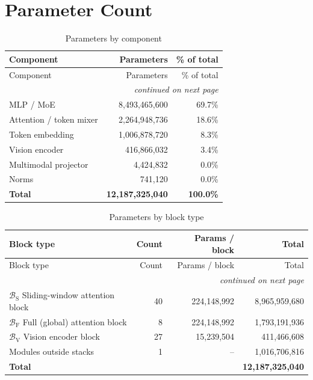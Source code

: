 \documentclass[10pt,a4paper]{article}
\theoremstyle{definition}
\begin{document}
\section{Parameter Count}
\begin{longtable}{lrr}
\caption{Parameters by component}\\
\toprule
Component & Parameters & \% of total \\
\midrule
\endfirsthead
\toprule
Component & Parameters & \% of total \\
\midrule
\endhead
\midrule \multicolumn{3}{r}{\textit{continued on next page}} \\
\endfoot
\bottomrule
\endlastfoot
MLP / MoE & 8,493,465,600 & 69.7\% \\
Attention / token mixer & 2,264,948,736 & 18.6\% \\
Token embedding & 1,006,878,720 & 8.3\% \\
Vision encoder & 416,866,032 & 3.4\% \\
Multimodal projector & 4,424,832 & 0.0\% \\
Norms & 741,120 & 0.0\% \\
\midrule \textbf{Total} & \textbf{12,187,325,040} & \textbf{100.0\%} \\
\end{longtable}
\begin{longtable}{p{8cm}rrr}
\caption{Parameters by block type}\\
\toprule
Block type & Count & Params / block & Total \\
\midrule
\endfirsthead
\toprule
Block type & Count & Params / block & Total \\
\midrule
\endhead
\midrule \multicolumn{4}{r}{\textit{continued on next page}} \\
\endfoot
\bottomrule
\endlastfoot
$\mathcal{B}_{\mathrm{S}}$ Sliding-window attention block & 40 & 224,148,992 & 8,965,959,680 \\
$\mathcal{B}_{\mathrm{F}}$ Full (global) attention block & 8 & 224,148,992 & 1,793,191,936 \\
$\mathcal{B}_{\mathrm{V}}$ Vision encoder block & 27 & 15,239,504 & 411,466,608 \\
Modules outside stacks & 1 & -- & 1,016,706,816 \\
\midrule \textbf{Total} & & & \textbf{12,187,325,040} \\
\end{longtable}
\end{document}
